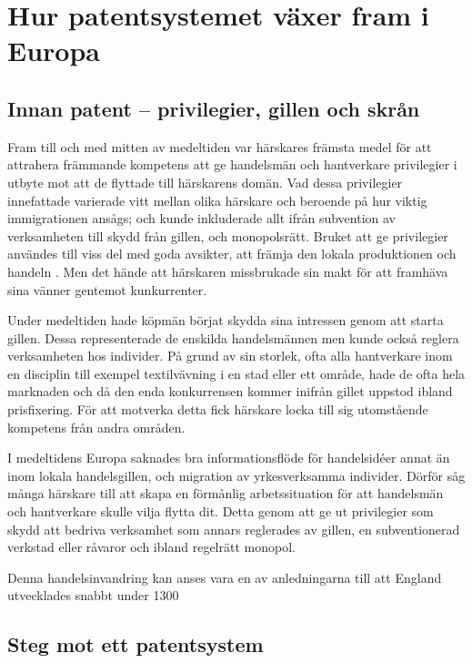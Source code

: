 \section{Hur patentsystemet växer fram i Europa}

\subsection{Innan patent -- privilegier, gillen och skrån} %
\label{sub:innan_patent_systemet}

Fram till och med mitten av medeltiden var härskares främsta medel för att
attrahera främmande kompetens att ge handelsmän och hantverkare privilegier i
utbyte mot att de flyttade till härskarens domän. 
Vad dessa privilegier innefattade varierade vitt mellan olika härskare och
beroende på hur viktig immigrationen ansågs; och kunde inkluderade allt ifrån
subvention av verksamheten till skydd från gillen, och monopolsrätt. 
Bruket att ge privilegier användes till viss del med goda avsikter, att främja
den lokala produktionen och handeln \cite{nard}. Men det hände att härskaren
missbrukade sin makt för att framhäva sina vänner gentemot kunkurrenter.

Under medeltiden hade köpmän börjat skydda sina intressen genom att starta
gillen. 
Dessa representerade de enskilda handelsmännen men kunde också reglera
verksamheten hos individer.
På grund av sin storlek, ofta alla hantverkare inom en disciplin till exempel
textilvävning i en stad eller ett område, hade de ofta hela marknaden och då
den enda konkurrensen kommer inifrån gillet uppstod ibland prisfixering. 
För att motverka detta fick härskare locka till sig utomstående kompetens från
andra områden.

I medeltidens Europa saknades bra informationsflöde för handelsidéer annat än
inom lokala handelsgillen, och migration av yrkesverksamma individer. 
Dörför såg många härskare till att skapa en förmånlig arbetssituation för att
handelsmän och hantverkare skulle vilja flytta dit. 
Detta genom att ge ut privilegier som skydd att bedriva verksamhet som annars
reglerades av gillen, en subventionerad verkstad eller råvaror och ibland
regelrätt monopol.

Denna handelsinvandring kan anses vara en av anledningarna till att England
utvecklades snabbt under 1300



\subsection{Steg mot ett patentsystem} 

